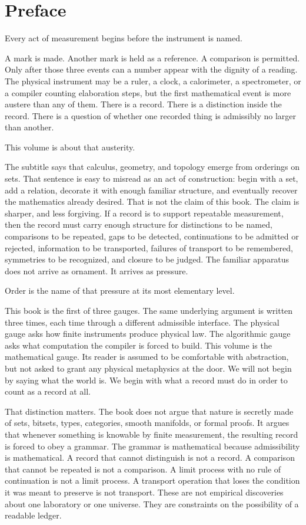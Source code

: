 \chapter*{Preface}
\label{chap:preface}

Every act of measurement begins before the instrument is named.

A mark is made. Another mark is held as a reference. A comparison is permitted.
Only after those three events can a number appear with the dignity of a reading.
The physical instrument may be a ruler, a clock, a calorimeter, a spectrometer,
or a compiler counting elaboration steps, but the first mathematical event is
more austere than any of them. There is a record. There is a distinction inside
the record. There is a question of whether one recorded thing is admissibly no
larger than another.

This volume is about that austerity.

The subtitle says that calculus, geometry, and topology emerge from orderings
on sets. That sentence is easy to misread as an act of construction: begin with
a set, add a relation, decorate it with enough familiar structure, and eventually
recover the mathematics already desired. That is not the claim of this book.
The claim is sharper, and less forgiving. If a record is to support repeatable
measurement, then the record must carry enough structure for distinctions to be
named, comparisons to be repeated, gaps to be detected, continuations to be
admitted or rejected, information to be transported, failures of transport to be
remembered, symmetries to be recognized, and closure to be judged. The familiar
apparatus does not arrive as ornament. It arrives as pressure.

Order is the name of that pressure at its most elementary level.

This book is the first of three gauges. The same underlying argument is written
three times, each time through a different admissible interface. The physical
gauge asks how finite instruments produce physical law. The algorithmic gauge
asks what computation the compiler is forced to build. This volume is the
mathematical gauge. Its reader is assumed to be comfortable with abstraction,
but not asked to grant any physical metaphysics at the door. We will not begin
by saying what the world is. We begin with what a record must do in order to
count as a record at all.

That distinction matters. The book does not argue that nature is secretly made
of sets, bitsets, types, categories, smooth manifolds, or formal proofs. It
argues that whenever something is knowable by finite measurement, the resulting
record is forced to obey a grammar. The grammar is mathematical because
admissibility is mathematical. A record that cannot distinguish is not a record.
A comparison that cannot be repeated is not a comparison. A limit process with
no rule of continuation is not a limit process. A transport operation that loses
the condition it was meant to preserve is not transport. These are not empirical
discoveries about one laboratory or one universe. They are constraints on the
possibility of a readable ledger.

